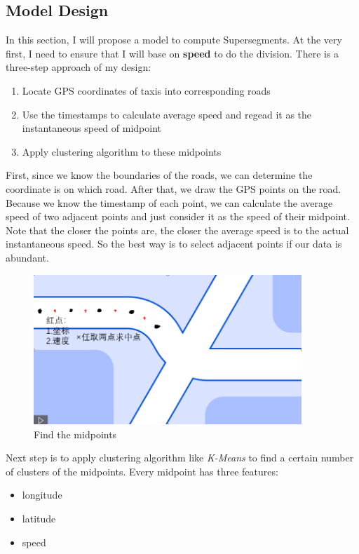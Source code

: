 \documentclass[fontset=none]{ctexart}
\theoremstyle{definition}
\theoremstyle{remark}
\begin{document}
\subsection{Model Design}
In this section, I will propose a model to compute Supersegments.
At the very first, I need to ensure that I will base on \textbf{speed} to do the division.
There is a three-step approach of my design:
\begin{enumerate}
    \item Locate GPS coordinates of taxis into corresponding roads
    \item Use the timestamps to calculate average speed and regead it as the instantaneous speed of midpoint
    \item Apply clustering algorithm to these midpoints
\end{enumerate}

First, since we know the boundaries of the roads, we can determine the coordinate is on which road.
After that, we draw the GPS points on the road. Because we know the timestamp of each point, we can 
calculate the average speed of two adjacent points and just consider it as the speed of their midpoint.
Note that the closer the points are, the closer the average speed is to the actual instantaneous speed.
So the best way is to select adjacent points if our data is abundant.
\begin{figure}[htb]
  \centering
  \includegraphics[width=0.9\textwidth]{images/midpoints.png}
  \caption{Find the midpoints}
  \label{fig: midpoint}
\end{figure}

Next step is to apply clustering algorithm like \textit{K-Means} to find a certain number of clusters
of the midpoints.
Every midpoint has three features:
\begin{itemize}
  \item longitude
  \item latitude
  \item speed
\end{itemize}
\end{document}
